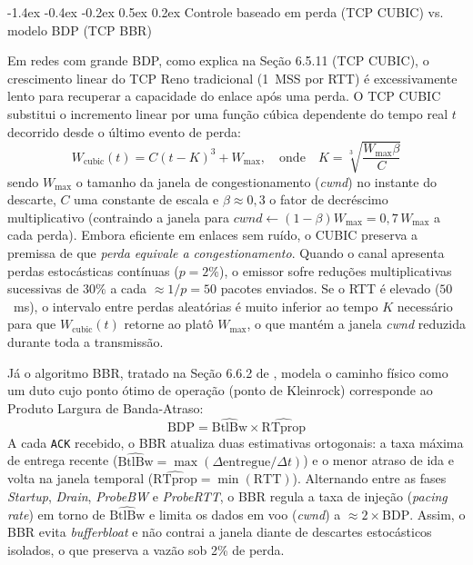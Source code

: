 \documentclass[12pt]{article}
\makeatletter
\renewcommand\subsection{\@startsection{subsection}{2}{\z@}%
                       {-1.4ex \@plus -0.4ex \@minus -0.2ex}%
                       {0.5ex \@plus 0.2ex}%
                       {\reset@font\normalsize\bfseries}}
\makeatother
\begin{document}
\subsection{Controle baseado em perda (TCP CUBIC) vs. modelo BDP (TCP BBR)}

Em redes com grande BDP, como explica \cite{tanenbaum2021} na Seção 6.5.11 (TCP CUBIC), o crescimento linear do TCP Reno tradicional (1~MSS por RTT) é excessivamente lento para recuperar a capacidade do enlace após uma perda. O TCP CUBIC substitui o incremento linear por uma função cúbica dependente do tempo real $t$ decorrido desde o último evento de perda:
\begin{equation}
W_{\text{cubic}}(t) = C(t - K)^3 + W_{\max}, \quad \text{onde} \quad K = \sqrt[3]{\frac{W_{\max}\beta}{C}}
\label{eq:cubic}
\end{equation}
sendo $W_{\max}$ o tamanho da janela de congestionamento (\textit{cwnd}) no instante do descarte, $C$ uma constante de escala e $\beta \approx 0{,}3$ o fator de decréscimo multiplicativo (contraindo a janela para $cwnd \leftarrow (1 - \beta)W_{\max} = 0{,}7\,W_{\max}$ a cada perda). Embora eficiente em enlaces sem ruído, o CUBIC preserva a premissa de que \textit{perda equivale a congestionamento}. Quando o canal apresenta perdas estocásticas contínuas ($p = 2\%$), o emissor sofre reduções multiplicativas sucessivas de $30\%$ a cada $\approx 1/p = 50$ pacotes enviados. Se o RTT é elevado ($50$~ms), o intervalo entre perdas aleatórias é muito inferior ao tempo $K$ necessário para que $W_{\text{cubic}}(t)$ retorne ao platô $W_{\max}$, o que mantém a janela \textit{cwnd} reduzida durante toda a transmissão.

Já o algoritmo BBR, tratado na Seção 6.6.2 de \cite{tanenbaum2021}, modela o caminho físico como um duto cujo ponto ótimo de operação (ponto de Kleinrock) corresponde ao Produto Largura de Banda-Atraso:
\begin{equation}
\text{BDP} = \widehat{\text{BtlBw}} \times \widehat{\text{RTprop}}
\label{eq:bdp}
\end{equation}
A cada \texttt{ACK} recebido, o BBR atualiza duas estimativas ortogonais: a taxa máxima de entrega recente ($\widehat{\text{BtlBw}} = \max(\Delta \text{entregue}/\Delta t)$) e o menor atraso de ida e volta na janela temporal ($\widehat{\text{RTprop}} = \min(\text{RTT})$). Alternando entre as fases \textit{Startup}, \textit{Drain}, \textit{ProbeBW} e \textit{ProbeRTT}, o BBR regula a taxa de injeção (\textit{pacing rate}) em torno de $\widehat{\text{BtlBw}}$ e limita os dados em voo (\textit{cwnd}) a $\approx 2 \times \text{BDP}$. Assim, o BBR evita \textit{bufferbloat} e não contrai a janela diante de descartes estocásticos isolados, o que preserva a vazão sob 2\% de perda.
\end{document}
